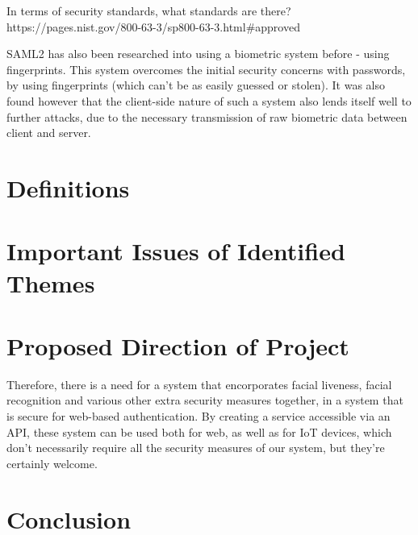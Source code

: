 \documentclass[14pt]{article}
\begin{document}
In terms of security standards, what standards are there? https://pages.nist.gov/800-63-3/sp800-63-3.html#approved


SAML2 has also been researched into using a biometric system before - using fingerprints. This system
overcomes the initial security concerns with passwords, by using fingerprints (which can't be as easily guessed or
stolen). It was also found however that the client-side nature of such a system also lends itself well to further attacks,
due to the necessary transmission of raw biometric data between client and server. \cite{SAMLFingerPrint}
\section{Definitions}


\section{Important Issues of Identified Themes}



\section{Proposed Direction of Project}
Therefore, there is a need for a system that encorporates facial liveness, facial recognition and various other
extra security measures together, in a system that is secure for web-based authentication. By creating a service
accessible via an API, these system can be used both for web, as well as for IoT devices, which don't necessarily require
all the security measures of our system, but they're certainly welcome.
\section{Conclusion}
\label{references}
\printbibliography
\end{document}
